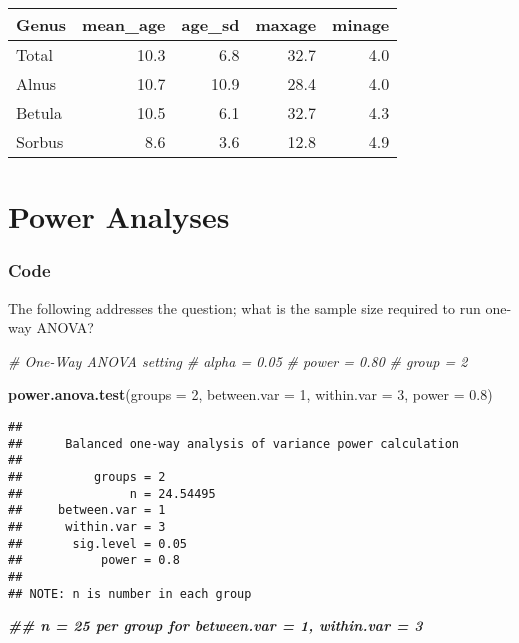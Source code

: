 \documentclass[
]{article}
\newenvironment{Shaded}{\begin{snugshade}}{\end{snugshade}}
\newcommand{\AttributeTok}[1]{\textcolor[rgb]{0.13,0.29,0.53}{#1}}
\newcommand{\CommentTok}[1]{\textcolor[rgb]{0.56,0.35,0.01}{\textit{#1}}}
\newcommand{\DecValTok}[1]{\textcolor[rgb]{0.00,0.00,0.81}{#1}}
\newcommand{\DocumentationTok}[1]{\textcolor[rgb]{0.56,0.35,0.01}{\textbf{\textit{#1}}}}
\newcommand{\FloatTok}[1]{\textcolor[rgb]{0.00,0.00,0.81}{#1}}
\newcommand{\FunctionTok}[1]{\textcolor[rgb]{0.13,0.29,0.53}{\textbf{#1}}}
\newcommand{\NormalTok}[1]{#1}
\begin{document}
\begin{longtable}[]{@{}lrrrr@{}}
\toprule\noalign{}
Genus & mean\_age & age\_sd & maxage & minage \\
\midrule\noalign{}
\endhead
\bottomrule\noalign{}
\endlastfoot
Total & 10.3 & 6.8 & 32.7 & 4.0 \\
Alnus & 10.7 & 10.9 & 28.4 & 4.0 \\
Betula & 10.5 & 6.1 & 32.7 & 4.3 \\
Sorbus & 8.6 & 3.6 & 12.8 & 4.9 \\
\end{longtable}

\section{Power Analyses}\label{power-analyses}

\subsubsection{Code}\label{code}

The following addresses the question; what is the sample size required
to run one-way ANOVA?

\begin{Shaded}
\begin{Highlighting}[]
\CommentTok{\# One{-}Way ANOVA setting}
\CommentTok{\# alpha = 0.05 }
\CommentTok{\# power = 0.80 }
\CommentTok{\# group = 2 }

\FunctionTok{power.anova.test}\NormalTok{(}\AttributeTok{groups =} \DecValTok{2}\NormalTok{, }\AttributeTok{between.var =} \DecValTok{1}\NormalTok{, }\AttributeTok{within.var =} \DecValTok{3}\NormalTok{, }\AttributeTok{power =} \FloatTok{0.8}\NormalTok{)}
\end{Highlighting}
\end{Shaded}

\begin{verbatim}
## 
##      Balanced one-way analysis of variance power calculation 
## 
##          groups = 2
##               n = 24.54495
##     between.var = 1
##      within.var = 3
##       sig.level = 0.05
##           power = 0.8
## 
## NOTE: n is number in each group
\end{verbatim}

\begin{Shaded}
\begin{Highlighting}[]
\DocumentationTok{\#\# n = 25 per group for between.var = 1, within.var = 3 }
\end{Highlighting}
\end{Shaded}
\end{document}
